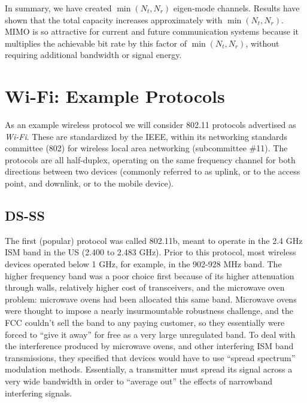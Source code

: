 In summary, we have created $\min (N_t, N_r)$ eigen-mode channels.  Results have shown that the total capacity increases approximately with $\min (N_t, N_r)$.  MIMO is so attractive for current and future communication systems because it multiplies the achievable bit rate by this factor of $\min (N_t, N_r)$, without requiring additional bandwidth or signal energy.




\section{Wi-Fi: Example Protocols}

As an example wireless protocol we will consider 802.11 protocols advertised as \emph{Wi-Fi}. These are standardized by the IEEE, within its networking standards committee (802) for wireless local area networking (subcommittee \#11).  The protocols are all half-duplex, operating on the same frequency channel for both directions between two devices (commonly referred to as uplink, or to the access point, and downlink, or to the mobile device).  

\subsection{DS-SS}

The first (popular) protocol was called 802.11b, meant to operate in the 2.4 GHz ISM band in the US (2.400 to 2.483 GHz).  Prior to this protocol, most wireless devices operated below 1 GHz, for example, in the 902-928 MHz band.  The higher frequency band was a poor choice first because of its higher attenuation through walls, relatively higher cost of transceivers, and the microwave oven problem: microwave ovens had been allocated this same band.  Microwave ovens were thought to impose a nearly insurmountable robustness challenge, and the FCC couldn't sell the band to any paying customer, so they essentially were forced to ``give it away'' for free as a very large unregulated band.  To deal with the interference produced by microwave ovens, and other interfering ISM band transmissions, they specified that devices would have to use ``spread spectrum'' modulation methods.  Essentially, a transmitter must spread its signal across a very wide bandwidth in order to ``average out'' the effects of narrowband interfering signals.  

